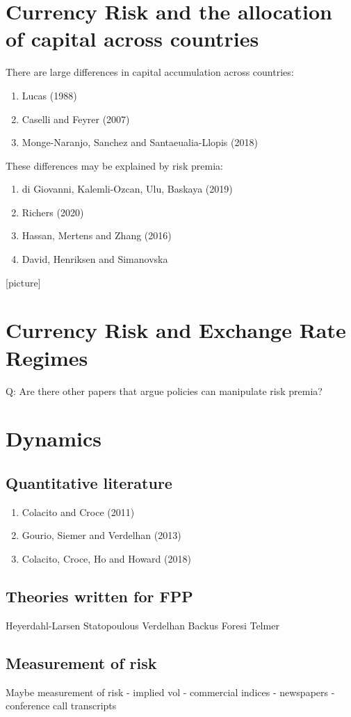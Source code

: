 \documentclass[12pt,letter]{article}
\theoremstyle{break} \theorembodyfont{\normalfont\itshape}
\theoremstyle{break}
\theoremstyle{break} \theorembodyfont{\normalfont\itshape}
\theoremstyle{break} \theorembodyfont{\normalfont\itshape}
\begin{document}
\section{Currency Risk and the allocation of capital across countries}
There are large differences in capital accumulation across countries:
\begin{enumerate}
\item Lucas (1988)
\item Caselli and Feyrer (2007)
\item Monge-Naranjo, Sanchez and Santaeualia-Llopis (2018)
\end{enumerate}
These differences may be explained by risk premia:
\begin{enumerate}
\item di Giovanni, Kalemli-Ozcan, Ulu, Baskaya (2019)
\item Richers (2020)
\item Hassan, Mertens and Zhang (2016)
\item David, Henriksen and Simanovska
\end{enumerate}
[picture]
\section{Currency Risk and Exchange Rate Regimes}
Q: Are there other papers that argue policies can manipulate risk premia?

\section{Dynamics}
\subsection{Quantitative literature}
\begin{enumerate}
\item Colacito and Croce (2011)
\item Gourio, Siemer and Verdelhan (2013)
\item Colacito, Croce, Ho and Howard (2018)
\end{enumerate}
\subsection{Theories written for FPP}
Heyerdahl-Larsen
Statopoulous
Verdelhan
Backus Foresi Telmer
\subsection{Measurement of risk}
Maybe measurement of risk
- implied vol
- commercial indices
- newspapers
- conference call transcripts
\end{document}
